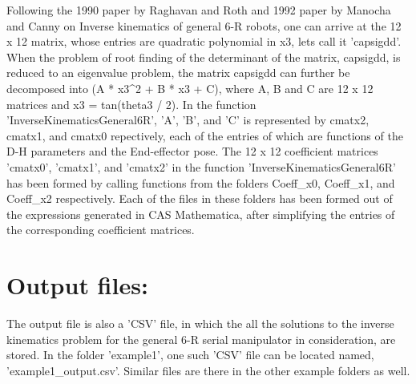 \begin{DoxyVerb}
Following the 1990 paper by Raghavan and Roth and 1992 paper by Manocha and Canny on Inverse kinematics of general 6-R robots, 
one can arrive at the 12 x 12 matrix, whose entries are quadratic polynomial in x3, lets call it 'capsigdd'. When the problem 
of root finding of the determinant of the matrix, capsigdd, is reduced to an eigenvalue problem, the matrix capsigdd can further 
be decomposed into (A * x3^2 + B * x3 + C), where A, B and C are 12 x 12 matrices and x3 = tan(theta3 / 2). In the function 'InverseKinematicsGeneral6R', 'A', 'B', and 'C' 
is represented by cmatx2, cmatx1, and cmatx0 repectively, each of the entries of which are functions of the D-H parameters and the End-effector pose.  
The 12 x 12 coefficient matrices 'cmatx0', 'cmatx1', and 'cmatx2' in the function 'InverseKinematicsGeneral6R' has been formed by calling functions from the folders 
Coeff_x0, Coeff_x1, and Coeff_x2 respectively. Each of the files in these folders has been formed out of the expressions generated in CAS Mathematica,
after simplifying the entries of the corresponding coefficient matrices.
\end{DoxyVerb}
\hypertarget{index_output}{}\section{Output files\+:}\label{index_output}
\begin{DoxyVerb}The output file is also a 'CSV' file, in which the all the solutions to the inverse kinematics problem for the general 6-R serial manipulator in consideration,
are stored. In the folder 'example1', one such 'CSV' file can be located named, 'example1_output.csv'. Similar files are there in the other example folders as well.\end{DoxyVerb}
 